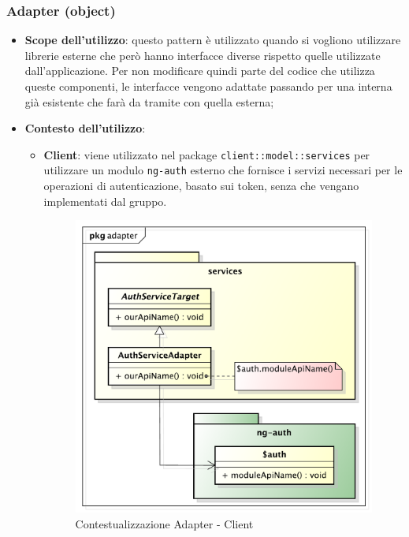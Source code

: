 	\subsubsection{Adapter (object)} %
	\label{ssub:adapter_object}
		\begin{itemize}
			\item \textbf{Scope dell'utilizzo}: questo pattern è utilizzato quando si vogliono utilizzare librerie esterne che però hanno interfacce diverse rispetto quelle utilizzate dall'applicazione. Per non modificare quindi parte del codice che utilizza queste componenti, le interfacce vengono adattate passando per una interna già esistente che farà da tramite con quella esterna;
			\item \textbf{Contesto dell'utilizzo}:
				\begin{itemize}
					\item \textbf{Client}: viene utilizzato nel package \texttt{client::model::services} per utilizzare un modulo \texttt{ng-auth} esterno che fornisce i servizi necessari per le operazioni di autenticazione, basato sui token, senza che vengano implementati dal gruppo.
					\begin{figure}[htbp]
						\centering
						\centerline{\includegraphics[scale=0.55]{./images/design_pattern_client/client_adapter.pdf}}
						\caption{Contestualizzazione Adapter - Client}
					\end{figure}
				\end{itemize}
		\end{itemize}

